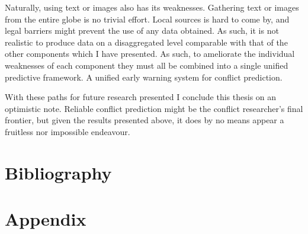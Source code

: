 \documentclass[a4paper]{article}
\begin{document}
Naturally, using text or images also has its weaknesses. Gathering text or images from the entire globe is no trivial effort. Local sources is hard to come by, and legal barriers might prevent the use of any data obtained. As such, it is not realistic to produce data on a disaggregated level comparable with that of the other components which I have presented. As such, to ameliorate the individual weaknesses of each component they must all be combined into a single unified predictive framework. A unified early warning system for conflict prediction.\par

With these paths for future research presented I conclude this thesis on an optimistic note. Reliable conflict prediction might be the conflict researcher's final frontier, but given the results presented above, it does by no means appear a fruitless nor impossible endeavour.\par


\pagebreak

\section{Bibliography}
 


\pagebreak
\section{Appendix}




\end{document}
